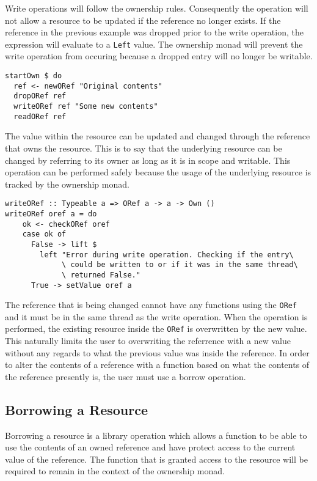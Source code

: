 \documentclass[onehalf,11pt]{beavtex}
\begin{document}
Write operations will follow the ownership rules. Consequently the operation
will not allow a resource to be updated if the reference no longer exists.
If the reference in the previous example was dropped prior to the write
operation, the expression will evaluate to a \texttt{Left} value.
The ownership monad will prevent the write operation from occuring because
a dropped entry will no longer be writable.

\begin{lstlisting}
startOwn $ do
  ref <- newORef "Original contents"
  dropORef ref
  writeORef ref "Some new contents"
  readORef ref
\end{lstlisting}

The value within the resource can be updated and changed through the reference
that owns the resource.
This is to say that the underlying resource can be changed by referring to its
owner as long as it is in scope and writable.
This operation can be performed safely because the usage of the underlying
resource is tracked by the ownership monad.

\begin{verbatim}
writeORef :: Typeable a => ORef a -> a -> Own ()
writeORef oref a = do
    ok <- checkORef oref
    case ok of
      False -> lift $
        left "Error during write operation. Checking if the entry\
             \ could be written to or if it was in the same thread\
             \ returned False."
      True -> setValue oref a
\end{verbatim}

The reference that is being changed cannot have any functions using the
\texttt{ORef} and it must be in the same thread as the write operation.
When the operation is performed, the existing resource inside the \texttt{ORef}
is overwritten by the new value.
This naturally limits the user to overwriting the referrence with a new value
without any regards to what the previous value was inside the reference.
In order to alter the contents of a reference with a function based on what
the contents of the reference presently is, the user must use a
borrow operation.

\subsection{Borrowing a Resource}

Borrowing a resource is a library operation which allows a function to be able
to use the contents of an owned reference and have protect access to
the current value of the reference.
The function that is granted access to the resource will be required to remain
in the context of the ownership monad.
\end{document}
